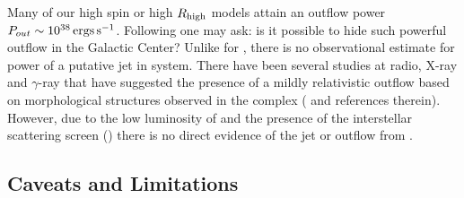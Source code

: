 Many of our high spin or high $R_\mathrm{high}$ models attain an outflow power $P_{out} \sim 10^{38} \,\mathrm{ergs\,s^{-1}}$. Following \citet{2007MNRAS.379.1519M} one may ask: is it possible to hide such powerful outflow in the Galactic Center? Unlike for , there is no observational estimate for power of a putative jet in \sgra system. There have been several studies at radio, X-ray and $\gamma$-ray that have suggested the presence of a mildly relativistic outflow based on morphological structures observed in the \sgra complex (\citealt{2012ApJ...758L..11Y,2012AAS...22051303S,Li_2013,2019ApJ...875...44Z,2021arXiv210713402B} and references therein). However, due to the low luminosity of \sgra and the presence of the interstellar scattering screen (\citealt{2016ApJ...824...40O,2017MNRAS.471.3563D,2018ApJ...865..104J,2019A&A...621A.119B}) there is no direct evidence of the jet or outflow from \sgra. 


\subsection{Caveats and Limitations}\label{sec:limits}






